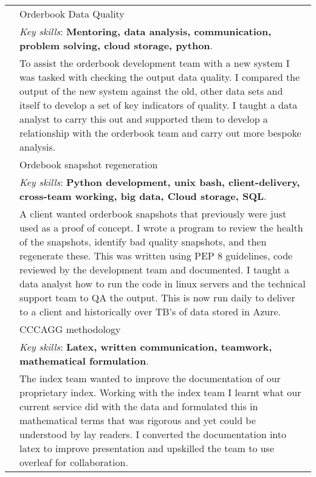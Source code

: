 \documentclass[a4paper,10pt]{article}
\newcommand{\tab}{\hspace{10 pt}}
\begin{document}
\begin{tabular}{p{2.25cm}|p{15cm}}
	 & \tab Orderbook Data Quality\\
	 & \footnotesize{\emph{Key skills}: \textbf{Mentoring, data analysis, communication, problem solving, cloud storage, python}.}\\
	 & \footnotesize{To assist the orderbook development team with a new system I was tasked with checking the output data quality. I compared the output of the new system against the old, other data sets and itself to develop a set of key indicators of quality. I taught a data analyst to carry this out and supported them to develop a relationship with the orderbook team and carry out more bespoke analysis.} \vspace{0.05 in}\\	
	 & \tab Ordebook snapshot regeneration\\
	 & \footnotesize{\emph{Key skills}: \textbf{Python development, unix bash, client-delivery, cross-team working, big data, Cloud storage, SQL}.}\\
	 & \footnotesize{A client wanted orderbook snapshots that previously were just used as a proof of concept. I wrote a program to review the health of the snapshots, identify bad quality snapshots, and then regenerate these. This was written using PEP 8 guidelines, code reviewed by the development team and documented. I taught a data analyst how to run the code in linux servers and the technical support team to QA the output. This is now run daily to deliver to a client and historically over TB’s of data stored in Azure.} \vspace{0.05 in}\\
	 & \tab CCCAGG methodology\\
	 & \footnotesize{\emph{Key skills}: \textbf{Latex, written communication, teamwork, mathematical formulation}.}\\
	 & \footnotesize{The index team wanted to improve the documentation of our proprietary index. Working with the index team I learnt what our current service did with the data and formulated this in mathematical terms that was rigorous and yet could be understood by lay readers. I converted the documentation into latex to improve presentation and upskilled the team to use overleaf for collaboration.} \vspace{0.05 in}\\	
\end{tabular}
\end{document}
